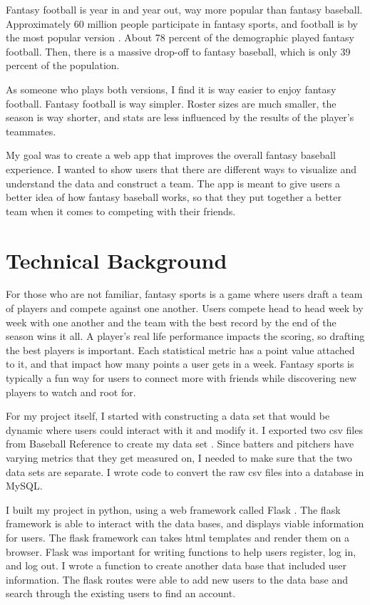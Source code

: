 \documentclass[10pt,twocolumn]{article}
\begin{document}
	Fantasy football is year in and year out, way more popular than fantasy baseball. Approximately 60 million people participate in fantasy sports, and football is by the most popular version \cite{Kravitz}. About 78 percent of the demographic played fantasy football. Then, there is a massive drop-off to fantasy baseball, which is only 39 percent of the population.
	
	As someone who plays both versions, I find it is way easier to enjoy fantasy football. Fantasy football is way simpler. Roster sizes are much smaller, the season is way shorter, and stats are less influenced by the results of the player’s teammates.
	
	My goal was to create a web app that improves the overall fantasy baseball experience. I wanted to show users that there are different ways to visualize and understand the data and construct a team. The app is meant to give users a better idea of how fantasy baseball works, so that they put together a better team when it comes to competing with their friends.


\section{Technical Background}
	For those who are not familiar, fantasy sports is a game where users draft a team of players and compete against one another. Users compete head to head week by week with one another and the team with the best record by the end of the season wins it all. A player's real life performance impacts the scoring, so drafting the best players is important. Each statistical metric has a point value attached to it, and that impact how many points a user gets in a week. Fantasy sports is typically a fun way for users to connect more with friends while discovering new players to watch and root for. 
	
	For my project itself, I started with constructing a data set that would be dynamic where users could interact with it and modify it. I exported two csv files from Baseball Reference to create my data set \cite{Baseball Reference}. Since batters and pitchers have varying metrics that they get measured on, I needed to make sure that the two data sets are separate. I wrote code to convert the raw csv files into a database in MySQL.
	
	I built my project in python, using a web framework called Flask \cite{Flask}. The flask framework is able to interact with the data bases, and displays viable information for users. The flask framework can takes html templates and render them on a browser. Flask was important for writing functions to help users register, log in, and log out. I wrote a function to create another data base that included user information. The flask routes were able to add new users to the data base and search through the existing users to find an account. 
	
\end{document}
